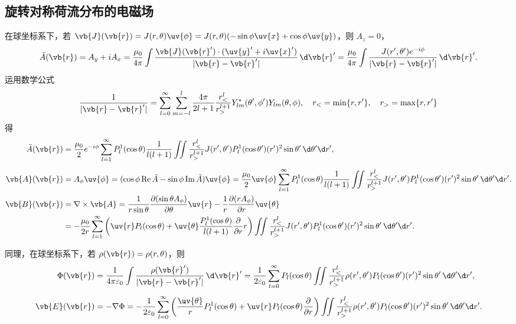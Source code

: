 \subsection{旋转对称荷流分布的电磁场}
在球坐标系下，若 \(\vb{J}(\vb{r}) = J(r,\theta) \uv{\phi} = J(r,\theta) (-\sin\phi \uv{x} + \cos\phi \uv{y})\)，则 \(A_z = 0\)，
\begin{equation*}
	\tilde{A}(\vb{r}) = A_y + iA_x
	= \frac{\mu_0}{4\pi} \int \frac{\vb{J}(\vb{r}') \cdot (\uv{y}' + i\uv{x}')}{|\vb{r} - \vb{r}'|} \,\d \vb{r}'
	= \frac{\mu_0}{4\pi} \int \frac{J(r',\theta') e^{-i\phi}}{|\vb{r} - \vb{r}'|} \,\d \vb{r}'.
\end{equation*}
运用数学公式
\begin{equation*}
	\frac{1}{|\vb{r} - \vb{r}'|} = \sum_{l=0}^\infty \sum_{m=-l}^l \frac{4\pi}{2l+1} \frac{r_<^l}{r_>^{l+1}} Y_{lm}^*(\theta',\phi') Y_{lm}(\theta,\phi),\quad r_< = \min\{r, r'\},\quad r_> = \max\{r, r'\}
\end{equation*}
得
\begin{align*}
	\tilde{A}(\vb{r})
	               & = \frac{\mu_0}{2} e^{-i\phi} \sum_{l=1}^\infty P_l^1(\cos\theta) \frac{1}{l(l+1)} \iint \frac{r_<^l}{r_>^{l+1}} J(r',\theta') P_l^1(\cos\theta') (r')^2 \sin\theta' \,\d \theta' \d r', \\[4pt]
	\vb{A}(\vb{r})
	               & = A_\phi \uv{\phi} = (\cos\phi \operatorname{Re}\tilde{A} - \sin\phi \operatorname{Im}\tilde{A}) \uv{\phi}
	= \frac{\mu_0}{2}\uv{\phi} \sum_{l=1}^\infty P_l^1(\cos\theta) \frac{1}{l(l+1)} \iint \frac{r_<^l}{r_>^{l+1}} J(r',\theta') P_l^1(\cos\theta') (r')^2 \sin\theta' \,\d \theta' \d r' .                   \\
	\vb{B}(\vb{r}) & = \nabla \times \vb{A}
	= \frac{1}{r\sin\theta} \frac{\partial (\sin\theta A_\phi)}{\partial \theta} \uv{r} - \frac{1}{r} \frac{\partial (r A_\phi)}{\partial r} \uv{\theta}
	\\&= -\frac{\mu_0}{2r} \sum_{l=1}^\infty \left( \uv{r} P_l(\cos\theta) + \uv{\theta} \frac{P_l^1(\cos\theta)}{l(l+1)} \frac{\partial}{\partial r} r \right) \iint \frac{r_<^l}{r_>^{l+1}} J(r',\theta') P_l^1(\cos\theta') (r')^2 \sin\theta' \,\d \theta' \d r'.
\end{align*}

同理，在球坐标系下，若 \(\rho(\vb{r}) = \rho(r,\theta)\)，则
\begin{align*}
	\Phi(\vb{r})
	 & = \frac{1}{4\pi\varepsilon_0} \int \frac{\rho(\vb{r}')}{|\vb{r} - \vb{r}'|} \,\d \vb{r}' = \frac{1}{2\varepsilon_0} \sum_{l=0}^\infty P_l(\cos\theta) \iint \frac{r_<^l}{r_>^{l+1}} \rho(r',\theta') P_l(\cos\theta') (r')^2 \sin\theta' \,\d \theta' \d r',                   \\[4pt]
	\vb{E}(\vb{r})
	 & = -\nabla\Phi = -\frac{1}{2\varepsilon_0} \sum_{l=0}^\infty \left( \frac{\uv{\theta}}{r} P_l^1(\cos\theta) + \uv{r} P_l(\cos\theta) \frac{\partial}{\partial r} \right) \iint \frac{r_<^l}{r_>^{l+1}} \rho(r',\theta') P_l(\cos\theta') (r')^2 \sin\theta' \,\d \theta' \d r'.
\end{align*}

